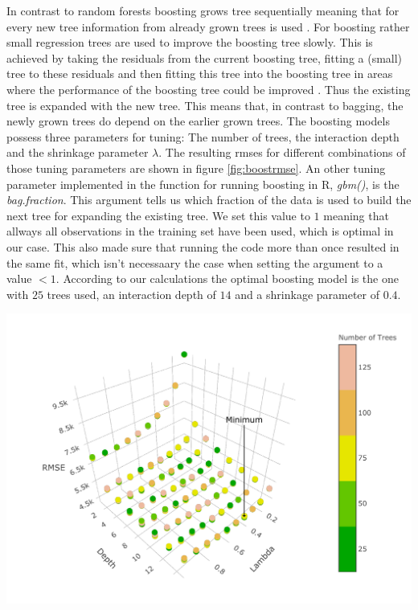 \documentclass[11pt,]{article}
\let\origfigure\figure
\let\endorigfigure\endfigure
\renewenvironment{figure}[1][2] {
    \expandafter\origfigure\expandafter[H]
} {
    \endorigfigure
}
\begin{document}
In contrast to random forests boosting grows tree sequentially meaning
that for every new tree information from already grown trees is used
\autocite[cf.][p. 322]{James2014}. For boosting rather small regression
trees are used to improve the boosting tree slowly. This is achieved by
taking the residuals from the current boosting tree, fitting a (small)
tree to these residuals and then fitting this tree into the boosting
tree in areas where the performance of the boosting tree could be
improved \autocite[cf.][p. 322]{James2014}. Thus the existing tree is
expanded with the new tree. This means that, in contrast to bagging, the
newly grown trees do depend on the earlier grown trees. The boosting
models possess three parameters for tuning: The number of trees, the
interaction depth and the shrinkage parameter \(\lambda\). The resulting
\ac{rmse}s for different combinations of those tuning parameters are
shown in figure \ref{fig:boostrmse}. An other tuning parameter
implemented in the function for running boosting in R, \emph{gbm()}, is
the \emph{bag.fraction}. This argument tells us which fraction of the
data is used to build the next tree for expanding the existing tree. We
set this value to \(1\) meaning that allways all observations in the
training set have been used, which is optimal in our case. This also
made sure that running the code more than once resulted in the same fit,
which isn't necessaary the case when setting the argument to a value
\(< 1\). According to our calculations the optimal boosting model is the
one with \(25\) trees used, an interaction depth of \(14\) and a
shrinkage parameter of \(0.4\).

\begin{figure}

{\centering \includegraphics{../00_data/output_paper/11_boosting_plot} 

}

\caption[RMSEs of the Boosting Model for Different Parameters]{\label{fig:boostrmse}Boosting: Dependency between RMSE, Lambda, the Depths and the Number of Trees that are Grown.}\label{fig:boosting_hyper}
\end{figure}
\end{document}
